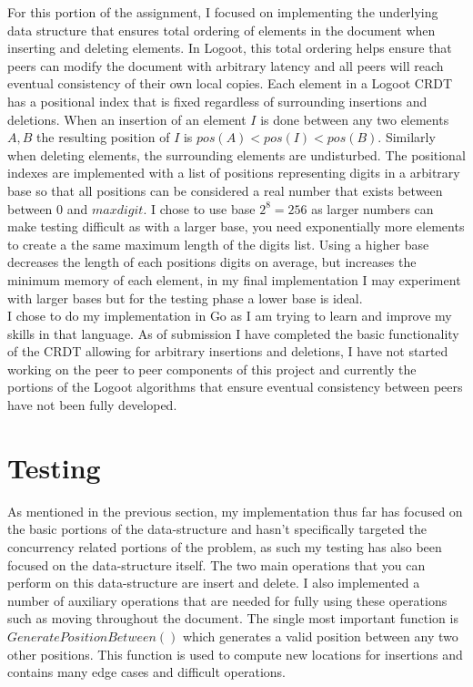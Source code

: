 \documentclass[11pt]{article}
\begin{document}
For this portion of the assignment, I focused on implementing the underlying data structure that ensures total ordering of elements in the document when inserting and deleting elements. In Logoot, this total ordering helps ensure that peers can modify the document with arbitrary latency and all peers will reach eventual consistency of their own local copies. Each element in a Logoot CRDT has a positional index that is fixed regardless of surrounding insertions and deletions. When an insertion of an element $I$ is done between any two elements $A,B$ the resulting position of $I$ is $pos(A) < pos(I) < pos(B)$. Similarly when deleting elements, the surrounding elements are undisturbed. The positional indexes are implemented with a list of positions representing digits in a arbitrary base so that all positions can be considered a real number that exists between between $0$ and $maxdigit$. I chose to use base $2^8=256$ as larger numbers can make testing difficult as with a larger base, you need exponentially more elements to create a the same maximum length of the digits list. Using a higher base decreases the length of each positions digits on average, but increases the minimum memory of each element, in my final implementation I may experiment with larger bases but for the testing phase a lower base is ideal.\\

I chose to do my implementation in Go as I am trying to learn and improve my skills in that language. As of submission I have completed the basic functionality of the CRDT allowing for arbitrary insertions and deletions, I have not started working on the peer to peer components of this project and currently the portions of the Logoot algorithms that ensure eventual consistency between peers have not been fully developed.

\pagebreak

\section{Testing}
As mentioned in the previous section, my implementation thus far has focused on the basic portions of the data-structure and  hasn't specifically targeted the concurrency related portions of the problem, as such my testing has also been focused on the data-structure itself. The two main operations that you can perform on this data-structure are insert and delete. I also implemented a number of auxiliary operations that are needed for fully using these operations such as moving throughout the document. The single most important function is $GeneratePositionBetween()$ which generates a valid position between any two other positions. This function is used to compute new locations for insertions and contains many edge cases and difficult operations.\\
\end{document}

